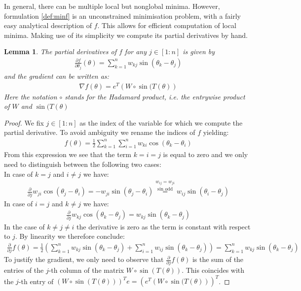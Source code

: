 \documentclass[12pt,a4paper]{article}
\theoremstyle{mythm}
\newtheorem{lem}[thm]{Lemma}
\begin{document}
In general, there can be multiple local but nonglobal minima.
However, formulation \ref{def:minf} is an unconstrained minimisation problem, with a fairly easy analytical description of $ f $. 
This allows for efficient computation of local minima.
Making use of its simplicity we compute its partial derivatives by hand.
\begin{lem}
The partial derivatives of $ f $ for any $ j \in \left[ 1 : n \right]  $ is given by
\begin{align*}
\frac{ \partial f }{ \partial \theta _{ j }  } (\theta) = \sum_{ k = 1 }^{ n } w _{ kj } \sin \left( \theta _{ k } - \theta _{ j }  \right) 
\end{align*} 
and the gradient can be written as:
\begin{align}
\label{eq:gradf} 
\nabla f(\theta) = e^T\left( W \circ \sin( T(\theta )  \right) 
\end{align} 
Here the notation $ \circ $ stands for the Hadamard product, i.e. the entrywise product of $ W $ and $ \sin( T (\theta )  $ 
\end{lem} 
\begin{proof}
We fix $ j \in \left[ 1:n \right] $ as the index of the variable for which we compute the partial derivative. To avoid ambiguity we rename the indices of $ f $ yielding:
\begin{align*}
f(\theta) = \frac{ 1 }{ 2 } \sum_{ k = 1 }^{ n } \sum_{ i = 1 }^{ n } w _{ ki } \cos( \theta_k - \theta_i ) 
\end{align*} 
From this expression we see that the term $ k=i=j $ is equal to zero and we only need to distinguish between the following two cases: \\
In case of $ k = j $ and $ i \neq j  $ we have:
\begin{align*}
\frac{ \partial  }{ \partial j } w _{ ji } \cos( \theta _{ j } - \theta_i)  = -w _{ ji } \sin( \theta_j - \theta_i  ) 
\overset{ w _{ ij } = w _{ ji }  }{ \overset{ \sin \text{ odd}   }{ =}  } 
w _{ij} \sin( \theta_i - \theta_j) 
\end{align*} 
In case of $ i = j $ and $ k \neq j  $ we have:
\begin{align*}
\frac{ \partial  }{ \partial j } w _{ kj } \cos( \theta _{ k } - \theta_j)  = w _{ kj } \sin( \theta_k - \theta_j  ) 
\end{align*} 
In the case of $ k \neq j \neq i $ the derivative is zero as the term is constant with respect to $ j $. 
By linearity we therefore conclude:
\begin{align*}
\frac{ \partial  }{ \partial j } f(\theta) = \frac{ 1 }{ 2 } \left( \sum_{ k = 1 }^{ n } w _{ kj } \sin( \theta_k - \theta_j ) + \sum_{ i = 1 }^{ n } w _{ ij } \sin( \theta_k
- \theta_j )   \right) = \sum_{ k = 1 }^{ n } w _{ kj } \sin( \theta_k - \theta_j )
\end{align*} 
To justify the gradient, we only need to observe that $ \frac{ \partial  }{ \partial j } f(\theta) $ is the sum of the entries of the $ j $-th column of the matrix $ W \circ
\sin( T(\theta) )  $. This coincides with the $ j $-th entry of $ \left( W \circ \sin( T(\theta) )  \right) ^T e = \left( e^T \left( W \circ \sin( T (\theta )  \right)
\right)^T$.
\end{proof}
\end{document}

